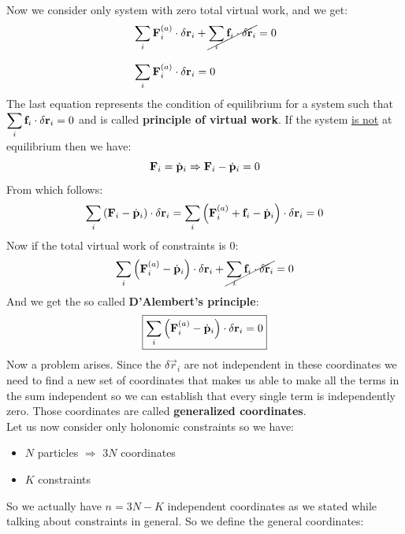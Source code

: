 Now we consider only system with zero total virtual work, and we get:
\begin{equation}
    \begin{split}
      &\displaystyle\sum_i \vb{F}^{(a)}_i \cdot \delta \vb{r}_i + \cancel{\displaystyle\sum_i \vb{f}_i \cdot \delta \vb{r}_i} = 0 \\[8pt]
      &\displaystyle\sum_i \vb{F}^{(a)}_i \cdot \delta \vb{r}_i = 0
    \end{split}
\end{equation}
The last equation represents the condition of equilibrium for a system such that $\displaystyle\sum_i \vb{f}_i \cdot \delta \vb{r}_i = 0$ and is called \textbf{principle of virtual work}.
If the system \underline{is not} at equilibrium then we have:
\begin{equation}
    \vb{F}_i = \dot{\vb{p}}_i \Rightarrow \vb{F}_i - \dot{\vb{p}}_i = 0
\end{equation}
From which follows:
\begin{equation}
    \displaystyle\sum_i \left(\vb{F}_i - \dot{\vb{p}}_i\right) \cdot \delta \vb{r}_i = \displaystyle\sum_i \left(\vb{F}^{(a)}_i + \vb{f}_i - \dot{\vb{p}}_i\right) \cdot \delta \vb{r}_i = 0
\end{equation}
Now if the total virtual work of constraints is 0:
\begin{equation}
    \displaystyle\sum_i \left(\vb{F}^{(a)}_i - \dot{\vb{p}}_i\right) \cdot \delta \vb{r}_i + \cancel{\displaystyle\sum_i \vb{f}_i \cdot \delta \vb{r}_i} = 0
\end{equation}
And we get the so called \textbf{D'Alembert's principle}:
\begin{equation}  \label{D'Alembert_principle}
    \boxed{\displaystyle\sum_i \left(\vb{F}^{(a)}_i - \dot{\vb{p}}_i\right) \cdot \delta \vb{r}_i = 0}
\end{equation}
Now a problem arises. Since the $\delta \vec{r}_i$ are not independent in these coordinates we need to find a new set of coordinates that makes us able to make all the terms in the sum independent so we can establish that every single term is independently zero.
Those coordinates are called \textbf{generalized coordinates}.\\
Let us now consider only holonomic constraints so we have:
\begin{itemize}
    \item $N$ particles $\Rightarrow$ $3N$ coordinates
    \item $K$ constraints
\end{itemize}
So we actually have $n = 3N-K$ independent coordinates as we stated while talking about constraints in general. So we define the general coordinates:
